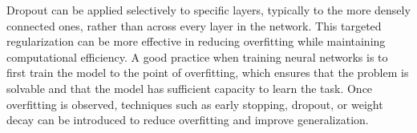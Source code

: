 Dropout can be applied selectively to specific layers, typically to the more densely connected ones, rather than across every layer in the network. 
This targeted regularization can be more effective in reducing overfitting while maintaining computational efficiency. 
A good practice when training neural networks is to first train the model to the point of overfitting, which ensures that the problem is solvable and that the model has sufficient capacity to learn the task. 
Once overfitting is observed, techniques such as early stopping, dropout, or weight decay can be introduced to reduce overfitting and improve generalization.